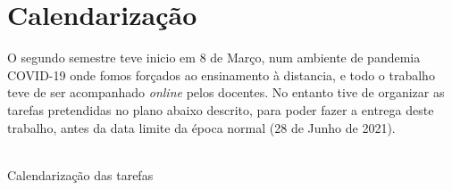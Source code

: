 \section{Calendarização}
O segundo semestre teve inicio em 8 de Março, num ambiente de pandemia COVID-19 onde fomos forçados ao ensinamento à distancia, e todo o trabalho teve de ser acompanhado \textit{online} pelos docentes. No entanto tive de organizar as tarefas pretendidas no plano abaixo descrito, para poder fazer a entrega deste trabalho, antes da data limite da época normal (28 de Junho de 2021).
\\
\\
\begin{table}[H]
	\caption{Calendarização das tarefas}
	\begin{ganttchart}{1}{20}
		\\
		\\
		 \\
		 \\
		 \\
		\\
		 \\
		 \\
		 \\%
		 \\%
		\\
		 \\
		 \\
		 \\
		 \\
	\end{ganttchart}
	\label{gantt}
\end{table}
\newpage

